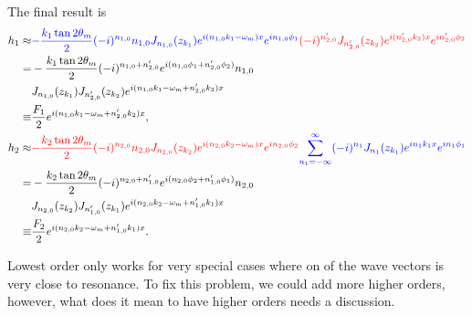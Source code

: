 The final result is
\begin{align}
   h_1 \approx & {\color{blue}-\frac{k_1 \tan 2\theta_m}{2} (-i)^{n_{1,0}} n_{1,0} J_{n_{1,0}} (z_{k_1}) e^{i (n_{1,0} k_1-\omega_m)x} e^{i n_{1,0}\phi_1} } {\color{red} (-i)^{n'_{2,0}} J_{n'_{2,0}}(z_{k_2}) e^{i(n'_{2,0}k_2)x} e^{i n'_{2,0} \phi_2}  } \nonumber \\
   =& -\frac{k_1 \tan 2\theta_m}{2} (-i)^{ n_{1,0}+n'_{2,0} }   e^{i (n_{1,0}\phi_1 + n'_{2,0} \phi_2)} n_{1,0} \nonumber\\
   &J_{n_{1,0}} (z_{k_1})  J_{n'_{2,0}}(z_{k_2}) e^{i(n_{1,0} k_1-\omega_m + n'_{2,0}k_2)x}  \\
   \equiv & \frac{F_1}{2} e^{i(n_{1,0} k_1-\omega_m + n'_{2,0}k_2)x}  , \\
   h_2 \approx & {\color{red} - \frac{k_2\tan 2\theta_m}{2} (-i)^{n_{2,0}} n_{2,0} J_{n_{2,0}}(z_{k_2}) e^{i(n_{2,0}k_2-\omega_m)x} e^{i n_{2,0} \phi_2}  }{\color{blue} \sum_{n_1=-\infty}^{\infty} (-i)^{n_1} J_{n_1}(z_{k_1}) e^{in_1 k_1 x} e^{i n_1 \phi_1} } \nonumber \\
   =& - \frac{k_2\tan 2\theta_m}{2} (-i)^{n_{2,0}+ n'_{1,0} }   e^{i (n_{2,0} \phi_2 + n'_{1,0} \phi_1)}  n_{2,0} \nonumber\\
   &J_{n_{2,0}}(z_{k_2})  J_{n'_{1,0}}(z_{k_1})  e^{i(n_{2,0}k_2-\omega_m+ n'_{1,0} k_1)x} \\
   \equiv & \frac{F_2}{2} e^{i(n_{2,0}k_2-\omega_m+ n'_{1,0} k_1)x} .
\end{align}


Lowest order only works for very special cases where on of the wave vectors is very close to resonance. To fix this problem, we could add more higher orders, however, what does it mean to have higher orders needs a discussion.

